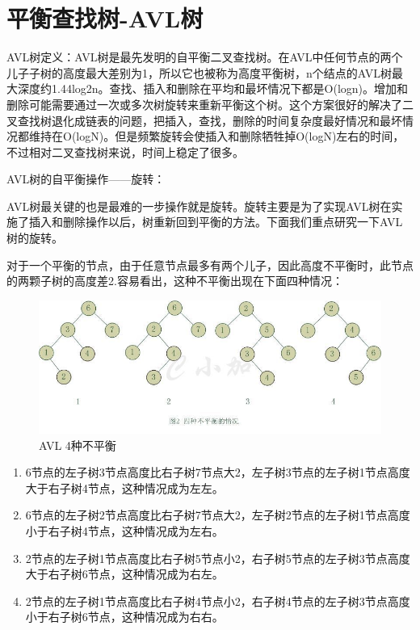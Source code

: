 \documentclass[UTF8,a4paper,12pt]{ctexbook}
\begin{document}
	\section{平衡查找树-AVL树}
			AVL树定义：AVL树是最先发明的自平衡二叉查找树。在AVL中任何节点的两个儿子子树的高度最大差别为1，所以它也被称为高度平衡树，n个结点的AVL树最大深度约1.44log2n。查找、插入和删除在平均和最坏情况下都是O(logn)。增加和删除可能需要通过一次或多次树旋转来重新平衡这个树。这个方案很好的解决了二叉查找树退化成链表的问题，把插入，查找，删除的时间复杂度最好情况和最坏情况都维持在O(logN)。但是频繁旋转会使插入和删除牺牲掉O(logN)左右的时间，不过相对二叉查找树来说，时间上稳定了很多。
			
			AVL树的自平衡操作——旋转：
			
			AVL树最关键的也是最难的一步操作就是旋转。旋转主要是为了实现AVL树在实施了插入和删除操作以后，树重新回到平衡的方法。下面我们重点研究一下AVL树的旋转。
			
			对于一个平衡的节点，由于任意节点最多有两个儿子，因此高度不平衡时，此节点的两颗子树的高度差2.容易看出，这种不平衡出现在下面四种情况：
			\begin{figure}[H]
				\centering
				\includegraphics[scale = 0.8]{AVL.jpg}
				\caption{AVL 4种不平衡}
				\label{AVL}
			\end{figure}
				
			\begin{enumerate}[itemindent = 1em,label = (\arabic{enumi})]
				\item  6节点的左子树3节点高度比右子树7节点大2，左子树3节点的左子树1节点高度大于右子树4节点，这种情况成为左左。
				\item  6节点的左子树2节点高度比右子树7节点大2，左子树2节点的左子树1节点高度小于右子树4节点，这种情况成为左右。
				\item  2节点的左子树1节点高度比右子树5节点小2，右子树5节点的左子树3节点高度大于右子树6节点，这种情况成为右左。
				\item  2节点的左子树1节点高度比右子树4节点小2，右子树4节点的左子树3节点高度小于右子树6节点，这种情况成为右右。
			\end{enumerate}
			
\end{document}
